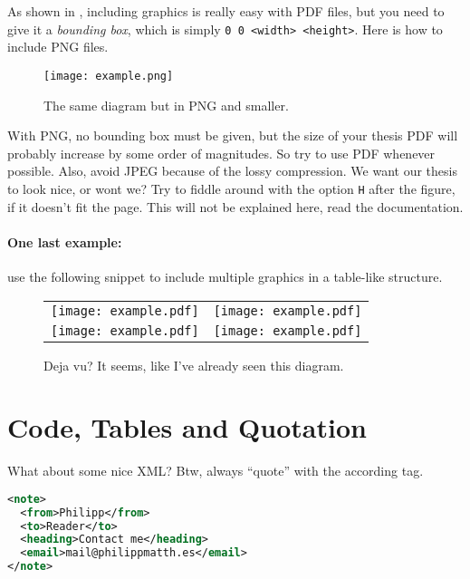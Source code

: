 \noindent As shown in , including graphics is really easy with PDF files, but you need to give it a \textit{bounding box}, which is simply \texttt{0 0 <width> <height>}. Here is how to include PNG files.

\begin{figure}[H]
\texttt{[image: example.png]}
\caption{The same diagram but in PNG and smaller.}\label{fig:example-small}
\end{figure}

\noindent With PNG, no bounding box must be given, but the size of your thesis PDF will probably increase by some order of magnitudes. So try to use PDF whenever possible. Also, avoid JPEG because of the lossy compression. We want our thesis to look nice, or wont we? Try to fiddle around with the option \texttt{H} after the figure, if it doesn't fit the page. This will not be explained here, read the documentation.

\paragraph{One last example:} use the following snippet to include multiple graphics in a table-like structure.

\begin{figure}[H]
\begin{tabular}{ll}
\texttt{[image: example.pdf]}
&
\texttt{[image: example.pdf]}
\\
\texttt{[image: example.pdf]}
&
\texttt{[image: example.pdf]}
\end{tabular}
\caption{Deja vu? It seems, like I've already seen this diagram.}\label{fig:example-multiple}
\end{figure}

\section{Code, Tables and Quotation}

What about some nice XML? Btw, always \enquote{quote} with the according tag.

\begin{lstlisting}[language=XML]
<note>
  <from>Philipp</from>
  <to>Reader</to>
  <heading>Contact me</heading>
  <email>mail@philippmatth.es</email>
</note>
\end{lstlisting}

